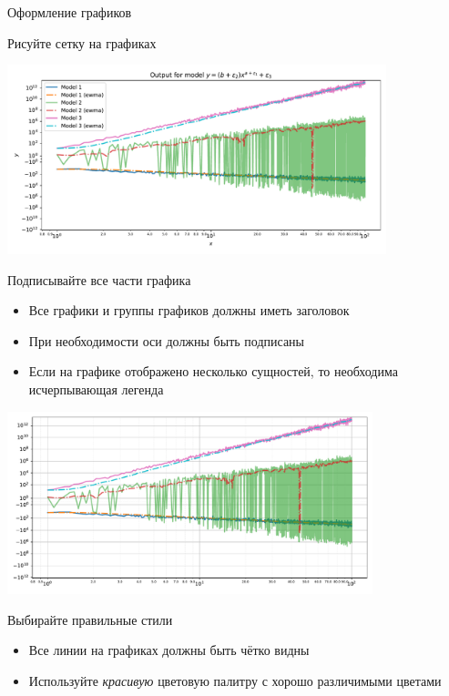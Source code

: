 \documentclass[fleqn, xcolor=x11names]{beamer}
\begin{document}
\begin{section}{Оформление графиков}
\begin{frame}{Рисуйте сетку на графиках}
	\begin{center}
		\includegraphics[height=5.5cm]{bad_plots/no_grid_plot.pdf}
	\end{center}
\end{frame}

\begin{frame}{Подписывайте все части графика}
    \begin{itemize}
        \item Все графики и группы графиков должны иметь заголовок
        \item При необходимости оси должны быть подписаны
        \item Если на графике отображено несколько сущностей, то необходима исчерпывающая легенда
    \end{itemize}

	\begin{center}
		\includegraphics[height=5.3cm]{bad_plots/no_labels_plot.pdf}
	\end{center}
\end{frame}

\begin{frame}{Выбирайте правильные стили}
    \begin{itemize}
        \item Все линии на графиках должны быть чётко видны
        \item Используйте \textit{красивую} цветовую палитру с хорошо различимыми цветами
    \end{itemize}


\end{frame}
\end{section}
\end{document}
